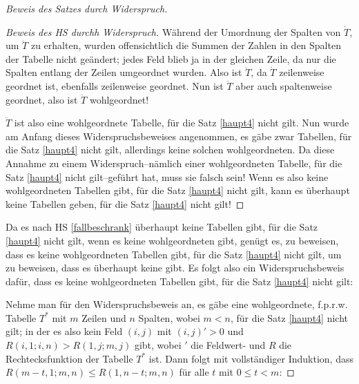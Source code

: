 \begin{proof}[Beweis des Satzes durch Widerspruch]
\begin{proof}[Beweis des HS durchh Widerspruch]
        Während der Umordnung der Spalten von $\dot T$, um $\ddot T$ zu erhalten, wurden offensichtlich die Summen der 
        Zahlen in den Spalten der Tabelle nicht geändert; jedes Feld blieb ja in der gleichen Zeile, da nur die 
        Spalten entlang der Zeilen umgeordnet wurden. Also ist $\ddot T$, da $\dot T$ zeilenweise geordnet ist, 
        ebenfalls zeilenweise geordnet. Nun ist $\ddot T$ aber auch spaltenweise geordnet, also ist $\ddot T$ 
        wohlgeordnet!

        $\ddot T$ ist also eine wohlgeordnete Tabelle, für die Satz \ref{haupt4} nicht gilt. Nun wurde am Anfang dieses 
        Widerspruchsbeweises angenommen, es gäbe zwar Tabellen, für die Satz \ref{haupt4} nicht gilt, allerdings keine 
        solchen wohlgeordneten. Da diese Annahme zu einem Widerspruch--nämlich einer wohlgeordneten Tabelle, für die 
        Satz \ref{haupt4} nicht gilt--geführt hat, muss sie falsch sein! Wenn es also keine wohlgeordneten Tabellen 
        gibt, für die Satz \eqref{haupt4} nicht gilt, kann es überhaupt keine Tabellen geben, für die Satz \ref{haupt4} 
        nicht gilt!
    \end{proof}
    Da es nach HS \ref{fallbeschrank} überhaupt keine Tabellen gibt, für die Satz \ref{haupt4} 
    nicht gilt, wenn es keine wohlgeordneten gibt, genügt es, zu beweisen, dass es keine wohlgeordneten Tabellen 
    gibt, für die Satz \ref{haupt4} nicht gilt, um zu beweisen, dass es überhaupt keine gibt. Es folgt also ein 
    Widerspruchsbeweis dafür, dass es keine wohlgeordneten Tabellen gibt, für die Satz \ref{haupt4} nicht gilt:

    Nehme man für den Widerspruchsbeweis an, es gäbe eine wohlgeordnete, f.p.r.w. Tabelle $T^*$ mit $m$ Zeilen und $n$ 
    Spalten, wobei $m<n$, für die Satz \ref{haupt4} nicht gilt; in der es also kein Feld $(i, j)$ mit $(i, j)'>0$ 
    und $R(i, 1; i, n)>R(1, j; m, j)$ gibt, wobei $'$ die Feldwert- und $R$ die Rechtecksfunktion der Tabelle $T^*$ 
    ist. Dann folgt mit vollständiger Induktion, dass $R(m-t, 1; m, n)\leq R(1, n-t; m, n)$ für alle $t$ mit $0\leq 
    t<m$:


\end{proof}
